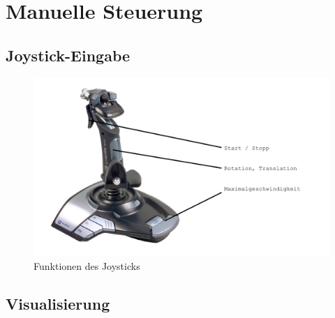 
\section{Manuelle Steuerung}
\subsection{Joystick-Eingabe}
\begin{figure}
\centering
    \includegraphics[width=.8\textwidth]{Abbildungen/Joystick}
    \caption{Funktionen des Joysticks}
    \label{fig:Joystick}
\end{figure}

\subsection{Visualisierung}
